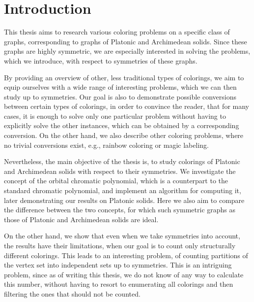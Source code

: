 \chapter*{Introduction}

\begin{highlight}

This thesis aims to research various coloring problems on a specific class of graphs, corresponding to graphs of Platonic and Archimedean solids. Since these graphs are highly symmetric, we are especially interested in solving the problems, which we introduce, with respect to symmetries of these graphs. 

By providing an overview of other, less traditional types of colorings, we aim to equip ourselves with a wide range of interesting problems, which we can then study up to symmetries. Our goal is also to demonstrate possible conversions between certain types of colorings, in order to convince the reader, that for many cases, it is enough to solve only one particular problem without having to explicitly solve the other instances, which can be obtained by a corresponding conversion. On the other hand, we also describe other coloring problems, where no trivial conversions exist, e.g., rainbow coloring or magic labeling.

Nevertheless, the main objective of the thesis is, to study colorings of Platonic and Archimedean solids with respect to their symmetries. We investigate the concept of the orbital chromatic polynomial, which is a counterpart to the standard chromatic polynomial, and implement an algorithm for computing it, later demonstrating our results on Platonic solids. Here we also aim to compare the difference between the two concepts, for which such symmetric graphs as those of Platonic and Archimedean solids are ideal.

On the other hand, we show that even when we take symmetries into account, the results have their limitations, when our goal is to count only structurally different colorings. This leads to an interesting problem, of counting partitions of the vertex set into independent sets up to symmetries. This is an intriguing problem, since as of writing this thesis, we do not know of any way to calculate this number, without having to resort to enumerating all colorings and then filtering the ones that should not be counted.

\end{highlight}